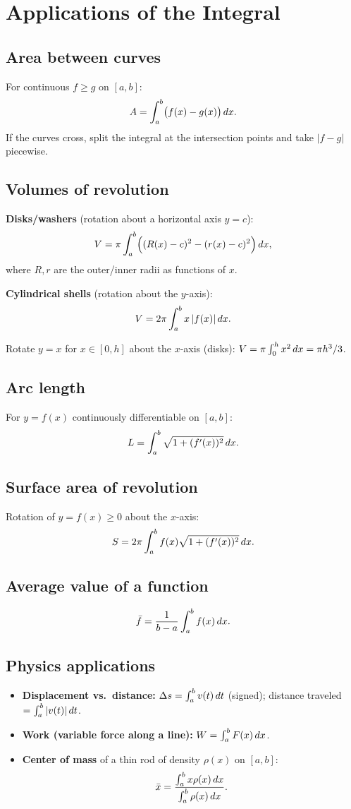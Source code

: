 \section{Applications of the Integral}

\subsection{Area between curves}
For continuous $f \ge g$ on $[a,b]$:
\[ A = \int_a^b \bigl(f(x) - g(x)\bigr) \,dx. \]
If the curves cross, split the integral at the intersection points and take
$|f - g|$ piecewise.

\subsection{Volumes of revolution}
\textbf{Disks/washers} (rotation about a horizontal axis $y = c$):
\[ V = \pi \int_a^b \Bigl( (R(x) - c)^2 - (r(x) - c)^2 \Bigr) \,dx, \]
where $R, r$ are the outer/inner radii as functions of $x$.

\textbf{Cylindrical shells} (rotation about the $y$-axis):
\[ V = 2\pi \int_a^b x \, |f(x)| \,dx. \]

\begin{example}[Cone]
Rotate $y = x$ for $x \in [0,h]$ about the $x$-axis (disks):
$V = \pi \int_0^h x^2 \,dx = \pi h^3 / 3$.
\end{example}

\subsection{Arc length}
For $y = f(x)$ continuously differentiable on $[a,b]$:
\[ L = \int_a^b \sqrt{1 + (f'(x))^2} \,dx. \]

\subsection{Surface area of revolution}
Rotation of $y = f(x) \ge 0$ about the $x$-axis:
\[ S = 2\pi \int_a^b f(x) \sqrt{1 + (f'(x))^2} \,dx. \]

\subsection{Average value of a function}
\[ \bar{f} = \frac{1}{b - a} \int_a^b f(x) \,dx. \]

\subsection{Physics applications}
\begin{itemize}[leftmargin=*,nosep]
  \item \textbf{Displacement vs.\ distance:} $\Delta s = \int_a^b v(t) \,dt$ (signed); distance traveled $= \int_a^b |v(t)| \,dt$.
  \item \textbf{Work (variable force along a line):} $W = \int_a^b F(x) \,dx$.
  \item \textbf{Center of mass} of a thin rod of density $\rho(x)$ on $[a,b]$:
  \[ \bar{x} = \frac{\int_a^b x \rho(x) \,dx}{\int_a^b \rho(x) \,dx}. \]
\end{itemize}


